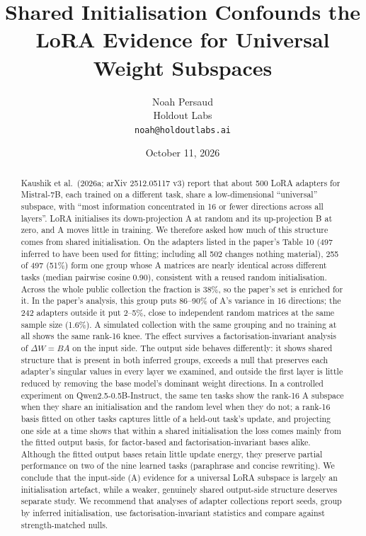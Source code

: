 \documentclass[
  11pt,
]{article}
\title{Shared Initialisation Confounds the LoRA Evidence for Universal
Weight Subspaces}
\author{Noah Persaud\\ Holdout Labs\\ \texttt{noah@holdoutlabs.ai}}
\date{October 11, 2026}
\begin{document}
\maketitle
\begin{abstract}
Kaushik et al.~(2026a; arXiv 2512.05117 v3) report that about 500 LoRA
adapters for Mistral-7B, each trained on a different task, share a
low-dimensional ``universal'' subspace, with ``most information
concentrated in 16 or fewer directions across all layers''. LoRA
initialises its down-projection A at random and its up-projection B at
zero, and A moves little in training. We therefore asked how much of
this structure comes from shared initialisation. On the adapters listed
in the paper's Table 10 (497 inferred to have been used for fitting;
including all 502 changes nothing material), 255 of 497 (51\%) form one
group whose A matrices are nearly identical across different tasks
(median pairwise cosine 0.90), consistent with a reused random
initialisation. Across the whole public collection the fraction is 38\%,
so the paper's set is enriched for it. In the paper's analysis, this
group puts 86--90\% of A's variance in 16 directions; the 242 adapters
outside it put 2--5\%, close to independent random matrices at the same
sample size (1.6\%). A simulated collection with the same grouping and
no training at all shows the same rank-16 knee. The effect survives a
factorisation-invariant analysis of \(\Delta W = BA\) on the input side.
The output side behaves differently: it shows shared structure that is
present in both inferred groups, exceeds a null that preserves each
adapter's singular values in every layer we examined, and outside the
first layer is little reduced by removing the base model's dominant
weight directions. In a controlled experiment on Qwen2.5-0.5B-Instruct,
the same ten tasks show the rank-16 A subspace when they share an
initialisation and the random level when they do not; a rank-16 basis
fitted on other tasks captures little of a held-out task's update, and
projecting one side at a time shows that within a shared initialisation
the loss comes mainly from the fitted output basis, for factor-based and
factorisation-invariant bases alike. Although the fitted output bases
retain little update energy, they preserve partial performance on two of
the nine learned tasks (paraphrase and concise rewriting). We conclude
that the input-side (A) evidence for a universal LoRA subspace is
largely an initialisation artefact, while a weaker, genuinely shared
output-side structure deserves separate study. We recommend that
analyses of adapter collections report seeds, group by inferred
initialisation, use factorisation-invariant statistics and compare
against strength-matched nulls.
\end{abstract}
\end{document}
